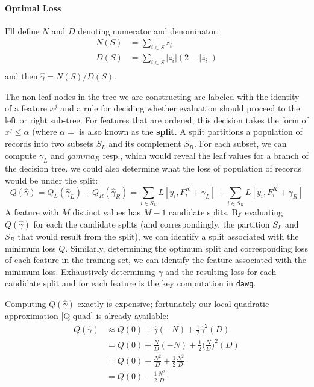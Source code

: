 \documentclass{article}
\begin{document}
\paragraph{Optimal Loss}

I'll define $N$ and $D$ denoting numerator and denominator:
\begin{equation*}
\begin{split}
N(S) &= \sum_{i \in S} z_i \\
D(S) &= \sum_{i \in S} | z_i | ( 2 - | z_i | ) \\
\end{split}
\end{equation*}
and then $\hat \gamma = N(S)/D(S)$.

The non-leaf nodes in the tree we are constructing are labeled with
the identity of a feature $x^j$ and a rule for deciding whether
evaluation should proceed to the left or right sub-tree.  For features
that are ordered, this decision takes the form of $x^j \le \alpha$
(where $\alpha =$ is also known as the {\bf split}.  A split
partitions a population of records into two subsets $S_L$ and its
complement $S_R$.  For each subset, we can compute $\gamma_L$ and
$gamma_R$ resp., which would reveal the leaf values for a branch of
the decision tree.  we could also determine what the loss of
population of records would be under the split:
\[
Q(\hat \gamma) = Q_L( \hat \gamma_L) + Q_R( \hat \gamma_R ) =
\sum_{i \in S_L} L [ y_i, F_i^K + \gamma_L ] +
\sum_{i \in S_R} L [ y_i, F_i^K + \gamma_R ]
\]
A feature with $M$ distinct values has $M-1$ candidate splits.  By
evaluating $Q(\hat \gamma)$ for each the candidate splits (and
correspondingly, the partition $S_L$ and $S_R$ that would result from
the split), we can identify a split associated with the minimum loss
$Q$.  Similarly, determining the optimum split and corresponding loss
of each feature in the training set, we can identify the feature
associated with the minimum loss.  Exhaustively determining $\gamma$
and the resulting loss for each candidate split and for each feature
is the key computation in \texttt{dawg}.

Computing $Q(\hat \gamma)$ exactly is expensive; fortunately our local
quadratic approximation \ref{Q-quad} is already available:
\begin{equation*}
\begin{split}
Q(\hat \gamma) &\approx
  Q(0) +
  \hat \gamma ( - N ) +
  \frac{1}{2} \hat \gamma^2 ( D ) \\
&= Q(0) + \frac{N}{D} (-N) +   \frac{1}{2} \big( \frac{N}{D} \big)^2 ( D ) \\
&= Q(0) - \frac{N^2}{D} + \frac{1}{2} \frac{N^2}{D} \\
&= Q(0) - \frac{1}{2} \frac{N^2}{D}
\end{split}
\end{equation*}
\end{document}
